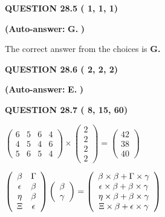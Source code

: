 \documentclass[12pt]{article}
\begin{document}
 
  
  
{\textbf{\large{QUESTION
28.5 
 (          1,          1,          1)
}}}
 
 
{\textbf{(Auto-answer:}}
{\textbf{\large{
G.}}}
{\textbf{)}}
 
 

The correct answer from the choices is
{\textbf{\large{
G.}}}
 
  
  
{\textbf{\large{QUESTION
28.6 
 (          2,          2,          2)
}}}
 
 
{\textbf{(Auto-answer:}}
{\textbf{\large{
E.}}}
{\textbf{)}}
 
 
  
  
{\textbf{\large{QUESTION
28.7 
 (          8,         15,         60)
}}}

 
$\left( \begin{array}{ccccccccccccccc}
           6 & 
           5 & 
           6 & 
           4 \\ 
           4 & 
           5 & 
           4 & 
           6 \\ 
           5 & 
           6 & 
           5 & 
           4
\end{array}\right) \times
\left( \begin{array}{c}
           2 \\ 
           2 \\ 
           2 \\ 
           2
\end{array}\right)  =
\left( \begin{array}{c}
          42 \\ 
          38 \\ 
          40
\end{array}\right)  $
 
$  %
 \left( \begin{array}
 {
 c
 c
 }
 \beta & 
 \Gamma \\ 
 \epsilon & 
 \beta \\ 
 \eta & 
 \beta \\ 
                    \Xi & 
 \epsilon
 \end{array} \right)
 \left( \begin{array}
 {
 c
 }
 \beta \\ 
 \gamma
 \end{array} \right)
=
  \left( \begin{array}
 {
 c
 }
 \beta \times  \beta   +  \Gamma \times  \gamma \\ 
 \epsilon \times  \beta   +  \beta \times  \gamma \\ 
 \eta \times  \beta   +  \beta \times  \gamma \\ 
                    \Xi \times  \beta   +  \epsilon \times  \gamma
 \end{array} \right)
$
 
\end{document}
